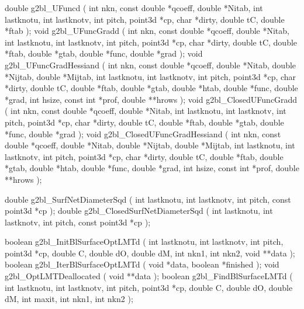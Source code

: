 \begin{listingC}
double g2bl_UFuncd ( int nkn, const double *qcoeff, double *Nitab,
                     int lastknotu, int lastknotv, int pitch, point3d *cp,
                     char *dirty,
                     double tC, double *ftab );
void g2bl_UFuncGradd ( int nkn, const double *qcoeff, double *Nitab,
                       int lastknotu, int lastknotv,
                       int pitch, point3d *cp, char *dirty,
                       double tC, double *ftab, double *gtab,
                       double *func, double *grad );
void g2bl_UFuncGradHessiand ( int nkn, const double *qcoeff, double *Nitab,
                              double *Nijtab, double *Mijtab,
                              int lastknotu, int lastknotv,  
                              int pitch, point3d *cp, char *dirty,
                              double tC, double *ftab, double *gtab, double
                              *htab,
                              double *func, double *grad,
                              int hsize, const int *prof, double **hrows );
void g2bl_ClosedUFuncGradd ( int nkn, const double *qcoeff, double *Nitab, 
                       int lastknotu, int lastknotv,
                       int pitch, point3d *cp, char *dirty,
                       double tC, double *ftab, double *gtab,
                       double *func, double *grad );
void g2bl_ClosedUFuncGradHessiand ( int nkn, const double *qcoeff, double *Nitab,
                              double *Nijtab, double *Mijtab,
                              int lastknotu, int lastknotv,  
                              int pitch, point3d *cp, char *dirty,
                              double tC, double *ftab, double *gtab, double
                              *htab,
                              double *func, double *grad,
                              int hsize, const int *prof, double **hrows );
\end{listingC}

\begin{listingC}
double g2bl_SurfNetDiameterSqd ( int lastknotu, int lastknotv,
                                 int pitch, const point3d *cp );
double g2bl_ClosedSurfNetDiameterSqd ( int lastknotu, int lastknotv,
                                       int pitch, const point3d *cp );
\end{listingC}

\begin{listingC}
boolean g2bl_InitBlSurfaceOptLMTd ( int lastknotu, int lastknotv, int pitch,
                                    point3d *cp,
                                    double C, double dO, double dM,
                                    int nkn1, int nkn2,
                                    void **data );
boolean g2bl_IterBlSurfaceOptLMTd ( void *data, boolean *finished );
void g2bl_OptLMTDeallocated ( void **data );
boolean g2bl_FindBlSurfaceLMTd ( int lastknotu, int lastknotv, int pitch,
                                 point3d *cp,
                                 double C, double dO, double dM,
                                 int maxit, int nkn1, int nkn2 );
\end{listingC}

